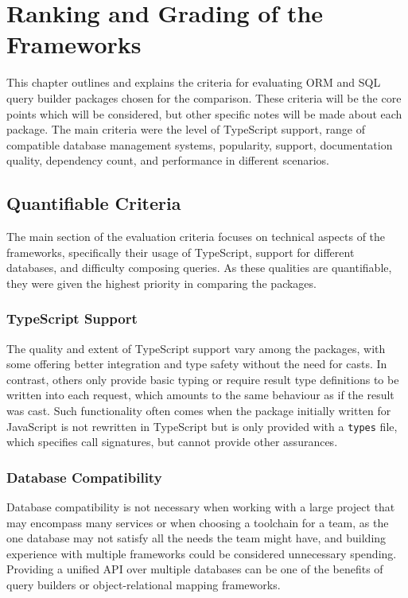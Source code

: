 \chapter{Ranking and Grading of the Frameworks}

This chapter outlines and explains the criteria for evaluating ORM and SQL query
builder packages chosen for the comparison. These criteria will be the core
points which will be considered, but other specific notes will be made about
each package. The main criteria were the level of TypeScript support, range of
compatible database management systems, popularity, support, documentation
quality, dependency count, and performance in different scenarios.

\section{Quantifiable Criteria}

The main section of the evaluation criteria focuses on technical aspects of the
frameworks, specifically their usage of TypeScript, support for different
databases, and difficulty composing queries. As these qualities are
quantifiable, they were given the highest priority in comparing the packages.

\subsection{TypeScript Support}

The quality and extent of TypeScript support vary among the packages, with some
offering better integration and type safety without the need for casts. In
contrast, others only provide basic typing or require result type definitions to
be written into each request, which amounts to the same behaviour as if the
result was cast. Such functionality often comes when the package initially
written for JavaScript is not rewritten in TypeScript but is only provided with
a \texttt{types} file, which specifies call signatures, but cannot provide other
assurances.

\subsection{Database Compatibility}

Database compatibility is not necessary when working with a large project that
may encompass many services or when choosing a toolchain for a team, as the one
database may not satisfy all the needs the team might have, and building
experience with multiple frameworks could be considered unnecessary spending.
Providing a unified API over multiple databases can be one of the benefits of
query builders or object-relational mapping frameworks.


